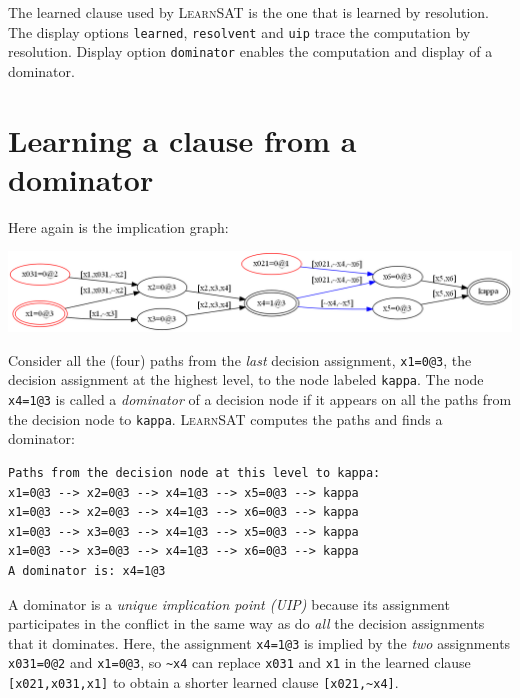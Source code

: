 \documentclass[11pt]{report}
\newcommand*{\p}[1]{\textup{\texttt{#1}}}
\newcommand*{\ls}{\textsc{LearnSAT}}
\begin{document}
The learned clause used by \ls{} is the one that is learned by resolution. The display options \p{learned}, \p{resolvent} and \p{uip} trace the computation by resolution. Display option \p{dominator} enables the computation and display of a dominator.

\newpage


\section{Learning a clause from a dominator}\label{learned.dom}

Here again is the implication graph:

\begin{center}
\includegraphics[keepaspectratio=true,width=\textwidth]{dom-color}
\end{center}


Consider all the (four) paths from the \emph{last} decision assignment, \p{x1=0@3}, the decision assignment at the highest level, to the node labeled \p{kappa}. The node \p{x4=1@3} is called a \emph{dominator} of a decision node if it appears on all the paths from the decision node to \p{kappa}. \ls{} computes the paths and finds a dominator:

\begin{verbatim}
Paths from the decision node at this level to kappa:
x1=0@3 --> x2=0@3 --> x4=1@3 --> x5=0@3 --> kappa
x1=0@3 --> x2=0@3 --> x4=1@3 --> x6=0@3 --> kappa
x1=0@3 --> x3=0@3 --> x4=1@3 --> x5=0@3 --> kappa
x1=0@3 --> x3=0@3 --> x4=1@3 --> x6=0@3 --> kappa
A dominator is: x4=1@3
\end{verbatim}

A dominator is a \emph{unique implication point (UIP)} because its
assignment participates in the conflict in the same way as do \emph{all}
the decision assignments that it dominates. Here, the assignment
\p{x4=1@3} is implied by the \emph{two} assignments \p{x031=0@2} and
\p{x1=0@3}, so \verb+~x4+ can replace \p{x031} and \p{x1} in the learned
clause \verb+[x021,x031,x1]+ to obtain a shorter learned clause
\verb+[x021,~x4]+.
\end{document}
